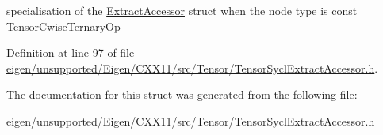 specialisation of the \hyperlink{struct_eigen_1_1_tensor_sycl_1_1internal_1_1_extract_accessor}{Extract\+Accessor} struct when the node type is const \hyperlink{class_eigen_1_1_tensor_cwise_ternary_op}{Tensor\+Cwise\+Ternary\+Op} 

Definition at line \hyperlink{eigen_2unsupported_2_eigen_2_c_x_x11_2src_2_tensor_2_tensor_sycl_extract_accessor_8h_source_l00097}{97} of file \hyperlink{eigen_2unsupported_2_eigen_2_c_x_x11_2src_2_tensor_2_tensor_sycl_extract_accessor_8h_source}{eigen/unsupported/\+Eigen/\+C\+X\+X11/src/\+Tensor/\+Tensor\+Sycl\+Extract\+Accessor.\+h}.



The documentation for this struct was generated from the following file\+:\begin{DoxyCompactItemize}
\item 
eigen/unsupported/\+Eigen/\+C\+X\+X11/src/\+Tensor/\+Tensor\+Sycl\+Extract\+Accessor.\+h\end{DoxyCompactItemize}
